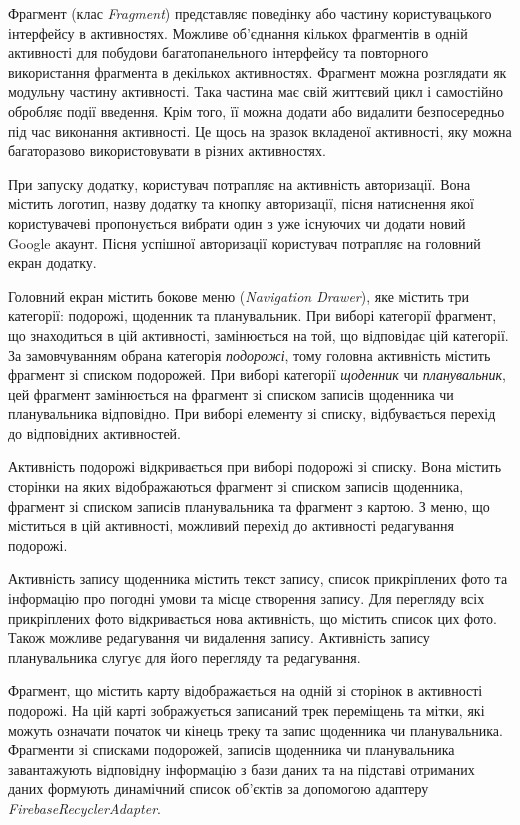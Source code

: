 \documentclass[../main.tex]{subfiles}
\begin{document}
Фрагмент (клас \textit{Fragment}) представляє поведінку або частину користувацького інтерфейсу в активностях. Можливе об'єднання кількох фрагментів в одній активності для побудови багатопанельного інтерфейсу та повторного використання фрагмента в декількох активностях. Фрагмент можна розглядати як модульну частину активності. Така частина має свій життєвий цикл і самостійно обробляє події введення. Крім того, її можна додати або видалити безпосередньо під час виконання активності. Це щось на зразок вкладеної активності, яку можна багаторазово використовувати в різних активностях.

При запуску додатку, користувач потрапляє на активність авторизації. Вона містить логотип, назву додатку та кнопку авторизації, пісня натиснення якої  користувачеві пропонується вибрати один з уже існуючих чи додати новий Google акаунт. Пісня успішної авторизації користувач потрапляє на головний екран додатку.

Головний екран містить бокове меню (\textit{Navigation Drawer}), яке містить три категорії: подорожі, щоденник та планувальник. При виборі категорії фрагмент, що знаходиться в цій активності, замінюється на той, що відповідає цій категорії. За замовчуванням обрана категорія \textit{подорожі}, тому головна активність містить фрагмент зі списком подорожей. При виборі категорії \textit{щоденник} чи \textit{планувальник}, цей фрагмент замінюється на фрагмент зі списком записів щоденника чи планувальника відповідно. При виборі елементу зі списку, відбувається перехід до відповідних активностей.

Активність подорожі відкривається при виборі подорожі зі списку. Вона містить сторінки на яких відображаються фрагмент зі списком записів щоденника, фрагмент зі списком записів планувальника та фрагмент з картою. З меню, що міститься в цій активності, можливий перехід до активності редагування подорожі.

Активність запису щоденника містить текст запису, список прикріплених фото та інформацію про погодні умови та місце створення запису. Для перегляду всіх прикріплених фото відкривається нова активність, що містить список цих фото. Також можливе редагування чи видалення запису. Активність запису планувальника слугує для його перегляду та редагування.

Фрагмент, що містить карту відображається на одній зі сторінок в активності подорожі. На цій карті зображується записаний трек переміщень та мітки, які можуть означати початок чи кінець треку та запис щоденника чи планувальника. Фрагменти зі списками подорожей, записів щоденника чи планувальника завантажують відповідну інформацію з бази даних та на підставі отриманих даних формують динамічний список об'єктів за допомогою адаптеру \textit{FirebaseRecyclerAdapter}.
\end{document}
